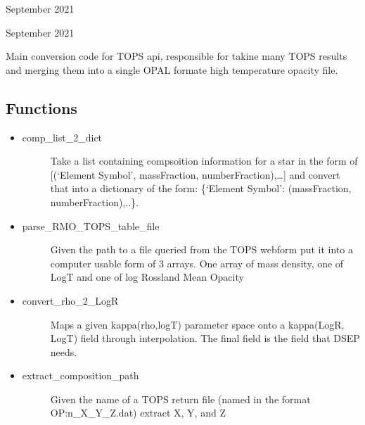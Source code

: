 \documentclass[letterpaper,10pt,english]{sphinxmanual}
\begin{document}
\sphinxAtStartPar
{} September 2021

\sphinxAtStartPar
{} September 2021

\sphinxAtStartPar
Main conversion code for TOPS api, responsible for takine many TOPS results and
merging them into a single OPAL formate high temperature opacity file.


\subsection{Functions}
\label{\detokenize{pyTOPSScrape.api:functions}}\begin{itemize}
\item {} \begin{description}
\item[{comp\_list\_2\_dict}] \leavevmode
\sphinxAtStartPar
Take a list containing compsoition information for a star in the form of
{[}(‘Element Symbol’, massFraction, numberFraction),…{]} and convert that
into a dictionary of the form:
\{‘Element Symbol’: (massFraction, numberFraction),..\}.

\end{description}

\item {} \begin{description}
\item[{parse\_RMO\_TOPS\_table\_file}] \leavevmode
\sphinxAtStartPar
Given the path to a file queried from the TOPS webform put it into a
computer usable form of 3 arrays. One array of mass density, one of
LogT and one of log Rossland Mean Opacity

\end{description}

\item {} \begin{description}
\item[{convert\_rho\_2\_LogR}] \leavevmode
\sphinxAtStartPar
Maps a given kappa(rho,logT) parameter space onto a kappa(LogR, LogT) field
through interpolation. The final field is the field that DSEP needs.

\end{description}

\item {} \begin{description}
\item[{extract\_composition\_path}] \leavevmode
\sphinxAtStartPar
Given the name of a TOPS return file (named in the format OP:n\_X\_Y\_Z.dat)
extract X, Y, and Z


\end{description}
\end{itemize}
\end{document}
